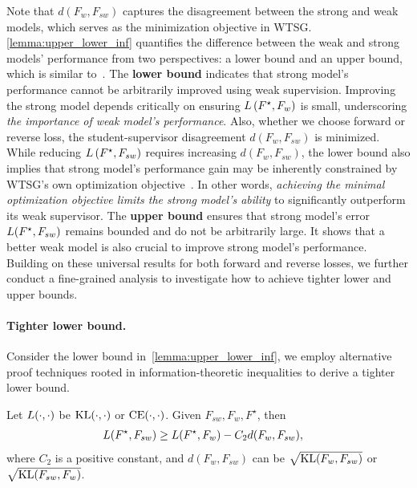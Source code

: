 Note that $d(F_w, F_{sw})$ captures the disagreement between the strong and weak models, which serves as the minimization objective in WTSG. 
\cref{lemma:upper_lower_inf} quantifies the difference between the weak and strong models' performance from two perspectives: a lower bound and an upper bound, which is similar to~\citet{yao2025understanding}.
The \textbf{lower bound} indicates that strong model's performance cannot be arbitrarily improved using weak supervision. 
Improving the strong model depends critically on ensuring $L\left( F^\star, F_w \right)$ is small, underscoring \textit{the importance of weak model's performance}.
Also, whether we choose forward or reverse loss, the student-supervisor disagreement $d(F_w, F_{sw})$ is minimized. 
While reducing $L\left( F^\star, F_{sw} \right)$ requires increasing $d(F_w, F_{sw})$, the lower bound also implies that strong model's performance gain may be inherently constrained by WTSG's own optimization objective~\citep{yao2025understanding}.
In other words, \textit{achieving the minimal optimization objective limits the strong model’s ability} to significantly outperform its weak supervisor.
The \textbf{upper bound} ensures that strong model's error $L(F^\star, F_{sw})$ remains bounded and do not be arbitrarily large.
It shows that a better weak model is also crucial to improve strong model's performance.
Building on these universal results for both forward and reverse losses, we further conduct a fine-grained analysis to investigate how to achieve tighter lower and upper bounds.


\paragraph{Tighter lower bound.}
Consider the lower bound in~\cref{lemma:upper_lower_inf}, we employ alternative proof techniques rooted in information-theoretic inequalities to derive a tighter lower bound.

\begin{theorem} \label{theorem:residue}
Let $L(\cdot, \cdot)$ be $\mathrm{KL}(\cdot, \cdot)$ or $\mathrm{CE}(\cdot, \cdot)$.
Given $F_{sw}, F_w, F^\star$, then
\begin{align*}
    & L(F^\star, F_{sw}) \ge L(F^\star, F_w) - C_2 d(F_w, F_{sw}),
\end{align*}
where $C_2$ is a positive constant, and $d(F_w, F_{sw})$ can be $\sqrt{\mathrm{KL}(F_w, F_{sw})}$ or $\sqrt{\mathrm{KL}(F_{sw}, F_w)}$.
\end{theorem}


